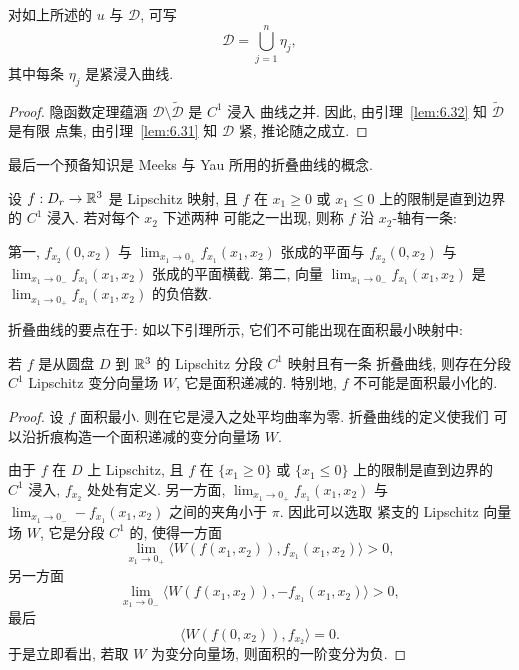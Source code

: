\begin{corollary}
\label{cor:6.33}
对如上所述的 $u$ 与 $\mathcal{D}$, 可写
\begin{equation}
\mathcal{D}=\bigcup_{j=1}^{n}\eta_j,
\label{eq:6.127}
\end{equation}
其中每条 $\eta_j$ 是紧浸入曲线.
\end{corollary}

\begin{proof}
隐函数定理蕴涵 $\mathcal{D}\setminus\tilde{\mathcal{D}}$ 是 $C^1$ 浸入
曲线之并. 因此, 由引理~\ref{lem:6.32} 知 $\tilde{\mathcal{D}}$ 是有限
点集, 由引理~\ref{lem:6.31} 知 $\mathcal{D}$ 紧, 推论随之成立.
\end{proof}

最后一个预备知识是 Meeks 与 Yau 所用的折叠曲线的概念.

\begin{definition}
\label{def:6.34}
设 $f:D_r\to\mathbb{R}^3$ 是 Lipschitz 映射, 且 $f$ 在 $x_1\geq0$ 或
$x_1\leq0$ 上的限制是直到边界的 $C^1$ 浸入. 若对每个 $x_2$ 下述两种
可能之一出现, 则称 $f$ 沿 $x_2$-轴有一条:

第一, $f_{x_2}(0,x_2)$ 与
$\lim_{x_1\to0_+}f_{x_1}(x_1,x_2)$ 张成的平面与 $f_{x_2}(0,x_2)$ 与
$\lim_{x_1\to0_-}f_{x_1}(x_1,x_2)$ 张成的平面横截. 第二, 向量
$\lim_{x_1\to0_-}f_{x_1}(x_1,x_2)$ 是
$\lim_{x_1\to0_+}f_{x_1}(x_1,x_2)$ 的负倍数.
\end{definition}

折叠曲线的要点在于: 如以下引理所示, 它们不可能出现在面积最小映射中:

\begin{lemma}
\label{lem:6.35}
若 $f$ 是从圆盘 $D$ 到 $\mathbb{R}^3$ 的 Lipschitz 分段 $C^1$ 映射且有一条
折叠曲线, 则存在分段 $C^1$ Lipschitz 变分向量场 $W$, 它是面积递减的.
特别地, $f$ 不可能是面积最小化的.
\end{lemma}

\begin{proof}
设 $f$ 面积最小. 则在它是浸入之处平均曲率为零. 折叠曲线的定义使我们
可以沿折痕构造一个面积递减的变分向量场 $W$.

由于 $f$ 在 $D$ 上 Lipschitz, 且 $f$ 在 $\{x_1\geq0\}$ 或
$\{x_1\leq0\}$ 上的限制是直到边界的 $C^1$ 浸入, $f_{x_2}$ 处处有定义.
另一方面,
$\lim_{x_1\to0_+}f_{x_1}(x_1,x_2)$ 与
$\lim_{x_1\to0_-}-f_{x_1}(x_1,x_2)$ 之间的夹角小于 $\pi$. 因此可以选取
紧支的 Lipschitz 向量场 $W$, 它是分段 $C^1$ 的, 使得一方面
\begin{equation}
\lim_{x_1\to0_+}\bigl\langle W(f(x_1,x_2)),f_{x_1}(x_1,x_2)\bigr\rangle>0,
\label{eq:6.128}
\end{equation}
另一方面
\begin{equation}
\lim_{x_1\to0_-}\bigl\langle W(f(x_1,x_2)),-f_{x_1}(x_1,x_2)\bigr\rangle>0,
\label{eq:6.129}
\end{equation}
最后
\begin{equation}
\bigl\langle W(f(0,x_2)),f_{x_2}\bigr\rangle=0.
\label{eq:6.130}
\end{equation}
于是立即看出, 若取 $W$ 为变分向量场, 则面积的一阶变分为负.
\end{proof}

